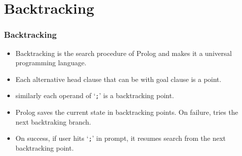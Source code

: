 \section{Backtracking}
\begin{frame}
\frametitle{Backtracking}
\begin{itemize}
\item Backtracking is the search procedure of Prolog and makes it a universal
programming language.
\item Each alternative head clause that can be  with goal clause
is a  point.
\item similarly each operand of `\texttt{;}' is a backtracking point.
\item Prolog saves the current state in backtracking points. On failure,
tries the next backtraking branch.
\item On success, if user hits `\texttt{;}' in prompt, it resumes
search from the next backtracking point.
\end{itemize}
\end{frame}
\def\BT{\textcolor{red!50!black}{\small\bf ;}}

